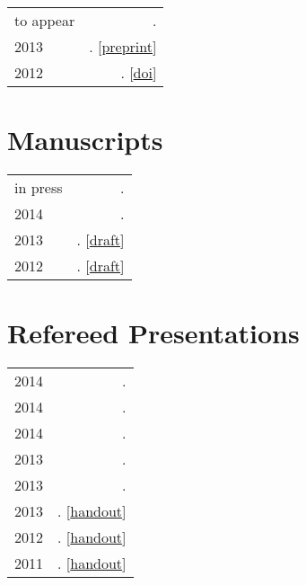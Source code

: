\documentclass[a4paper]{article}
\makeatletter
\newcommand{\myvrule}{\color{lightgray}\vrule width 1.0pt}
\newenvironment{cvsection}{%
  \renewcommand{\arraystretch}{1.75}
  \begin{longtable}[l]{@{} L R @{}}
}{%
  \end{longtable}
}
\makeatother
\begin{document}
\begin{cvsection}
  to appear & \null{}. \\

  2013 & \null{}.
  [\href{http://people.linguistics.mcgill.ca/~brian.buccola/files/buccola2013-fg.pdf}{preprint}] \\

  2012 & \null{}.
  [\href{http://dx.doi.org/10.3765/sp}{doi}] \\
\end{cvsection}

\section*{Manuscripts}

\begin{cvsection}
  in press & \null{}. \\

  2014 & \null{}. \\

  2013 & \null{}.
  [\href{http://people.linguistics.mcgill.ca/~brian.buccola/files/buccola2013-eval2.pdf}{draft}] \\

  2012 & \null{}.
  [\href{http://people.linguistics.mcgill.ca/~brian.buccola/files/buccola2012-eval1.pdf}{draft}] \\
\end{cvsection}

\section*{Refereed Presentations}

\begin{cvsection}
  2014 & \null{}. \\
  2014 & \null{}. \\
  2014 & \null{}. \\
  2013 & \null{}. \\
  2013 & \null{}. \\
  2013 & \null{}.
  [\href{http://people.linguistics.mcgill.ca/~brian.buccola/files/buccola2013-mot.pdf}{handout}] \\

  2012 & \null{}.
  [\href{http://people.linguistics.mcgill.ca/~brian.buccola/files/buccola2012-tom5.pdf}{handout}] \\

  2011 & \null{}.
  [\href{http://people.linguistics.mcgill.ca/~brian.buccola/files/buccola2011-tom4.pdf}{handout}] \\
\end{cvsection}
\end{document}
